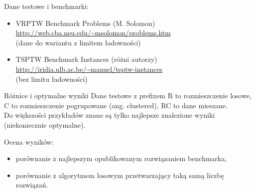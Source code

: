 \begin{frame}
Dane testowe i benchmarki:
\begin{itemize}
\item VRPTW Benchmark Problems (M. Solomon)  \\ \url{http://web.cba.neu.edu/~msolomon/problems.htm} \\
(dane do wariantu z limitem ładowności)
\item TSPTW Benchmark Instances (różni autorzy) \\ \url{http://iridia.ulb.ac.be/~manuel/tsptw-instances} \\
(bez limitu ładowności)
\end{itemize}

\begin{block}{Różnice i optymalne wyniki}
Dane testowe z prefixem R to rozmieszczenie losowe, C to rozmieszczenie pogrupowane (ang. clustered), RC to dane mieszane. \\
Do większości przykładów znane są tylko najlepsze znalezione wyniki (niekoniecznie optymalne).
\end{block}
\end{frame}

\begin{frame}
Ocena wyników:
\begin{itemize}
\item porównanie z najlepszym opublikowanym rozwiązaniem benchmarka,
\item porównanie z algorytmem losowym przetwarzający taką samą liczbę rozwiązań.
\end{itemize}
\end{frame}
